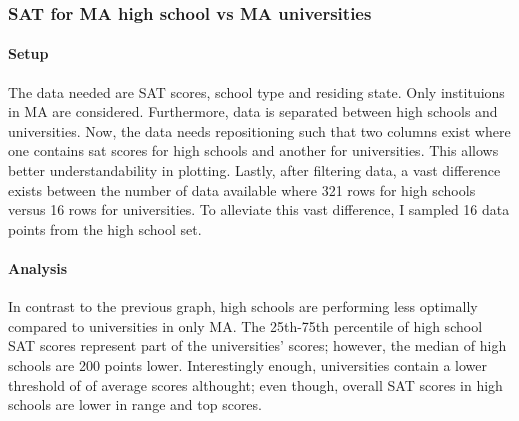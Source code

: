 \documentclass[11pt]{article}
\begin{document}
    \subsubsection{SAT for MA high school vs MA
universities}\label{sat-for-ma-high-school-vs-ma-universities}

\paragraph{Setup}\label{setup}

The data needed are SAT scores, school type and residing state. Only
instituions in MA are considered. Furthermore, data is separated between
high schools and universities. Now, the data needs repositioning such
that two columns exist where one contains sat scores for high schools
and another for universities. This allows better understandability in
plotting. Lastly, after filtering data, a vast difference exists between
the number of data available where 321 rows for high schools versus 16
rows for universities. To alleviate this vast difference, I sampled 16
data points from the high school set.

\paragraph{Analysis}\label{analysis}

In contrast to the previous graph, high schools are performing less
optimally compared to universities in only MA. The 25th-75th percentile
of high school SAT scores represent part of the universities' scores;
however, the median of high schools are 200 points lower. Interestingly
enough, universities contain a lower threshold of of average scores
althought; even though, overall SAT scores in high schools are lower in
range and top scores.
\end{document}
